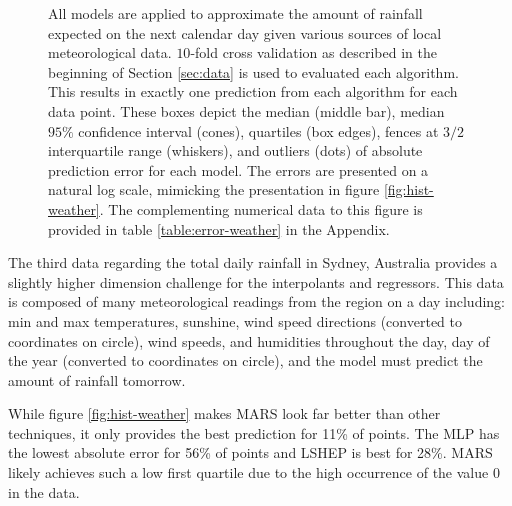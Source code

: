 \documentclass[smallextended,final]{svjour3}       %
\begin{document}
\begin{figure}
  \centering
  \caption{All models are applied to approximate the amount of
    rainfall expected on the next calendar day given various sources
    of local meteorological data. $10$-fold cross validation as
    described in the beginning of Section \ref{sec:data} is used to
    evaluated each algorithm. This results in exactly one prediction
    from each algorithm for each data point. These boxes depict the
    median (middle bar), median $95\%$ confidence interval (cones),
    quartiles (box edges), fences at $3/2$ interquartile range
    (whiskers), and outliers (dots) of absolute prediction error for
    each model. The errors are presented on a natural log scale,
    mimicking the presentation in figure \ref{fig:hist-weather}. The
    complementing numerical data to this figure is provided in table
    \ref{table:error-weather} in the Appendix.}
  \label{fig:error-weather}
\end{figure}

The third data regarding the total daily rainfall in Sydney, Australia
\cite{williams2009rattle} provides a slightly higher dimension
challenge for the interpolants and regressors. This data is composed
of many meteorological readings from the region on a day including:
min and max temperatures, sunshine, wind speed directions (converted
to coordinates on circle), wind speeds, and humidities throughout the
day, day of the year (converted to coordinates on circle), and the
model must predict the amount of rainfall tomorrow.

While figure \ref{fig:hist-weather} makes MARS look far better than
other techniques, it only provides the best prediction for 11\% of
points. The MLP has the lowest absolute error for 56\% of points and
LSHEP is best for 28\%. MARS likely achieves such a low first quartile
due to the high occurrence of the value 0 in the data.
\end{document}
